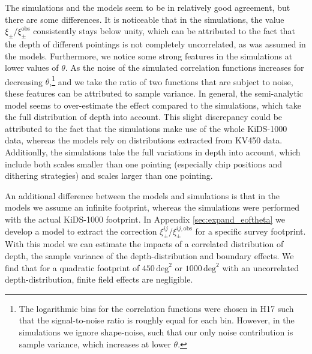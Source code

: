 \documentclass[referee]{aa} %
\renewcommand{\[}{\begin{equation}}
\renewcommand{\]}{\end{equation}}
\renewcommand{\rm}{\mathrm}
\begin{document}
The simulations and the models seem to be in relatively good agreement, but there are some differences. It is noticeable that in the simulations, the value $\xi_\pm/\xi_\pm^{\rm{obs}}$ consistently stays below unity, which can be attributed to the fact that the depth of different pointings is not completely uncorrelated, as was assumed in the models. Furthermore, we notice some strong features in the simulations at lower values of $\theta$.  As the noise of the simulated correlation functions increases for decreasing $\theta$,\footnote{The logarithmic bins for the correlation functions were chosen in H17 such that the signal-to-noise ratio is roughly equal for each bin. However, in the simulations we ignore shape-noise, such that our only noise contribution is sample variance, which increases at lower $\theta$.} and we take the ratio of two functions that are subject to noise, these features can be attributed to sample variance. In general, the semi-analytic model seems to over-estimate the effect compared to the simulations, which take the full distribution of depth into account. This slight discrepancy could be attributed to the fact that the simulations make use of the whole KiDS-1000 data, whereas the models rely on distributions extracted from KV450 data. Additionlly, the simulations take the full variations in depth into account, which include both scales smaller than one pointing (especially chip positions and dithering strategies) and scales larger than one pointing.

An additional difference between the models and simulations is that in the models we assume an infinite footprint, whereas the simulations were performed with the actual KiDS-1000 footprint. In Appendix \ref{sec:expand_eoftheta} we develop a model to extract the correction $\xi_\pm^{ij}/\xi_{\pm}^{ij,\rm{obs}}$ for a specific survey footprint. With this model we can estimate the impacts of a correlated distribution of depth, the sample variance of the depth-distribution and boundary effects. We find that for a quadratic footprint of $450\,\rm{deg}^2$ or $1000\,\rm{deg}^2$ with an uncorrelated depth-distribution, finite field effects are negligible.
\end{document}
